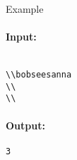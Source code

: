 Example  
\paragraph{\textbf{    Input:   }}
\begin{verbatim}

\\bobseesanna
\\
\\\end{verbatim}

\paragraph{   Output:  }
\begin{verbatim}
3\end{verbatim}